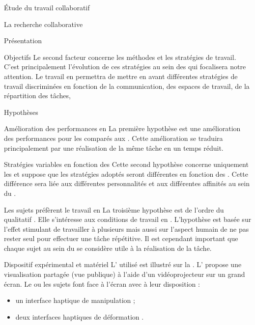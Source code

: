 \documentclass[myfrancais]{mythesis}
\begin{document}
\begin{mypart}{Étude du travail collaboratif}
\begin{mychapter}{La recherche collaborative}
\begin{mysection}{Présentation}
\begin{mysubsection}{Objectifs}
					Le second facteur concerne les méthodes et les stratégies de travail.
					C'est principalement l'évolution de ces stratégies au sein des  qui focalisera notre attention.
					Le travail en  permettra de mettre en avant différentes stratégies de travail discriminées en fonction de la communication, des espaces de travail, de la répartition des tâches, \myetc
				\end{mysubsection}
				\begin{mysubsection}{Hypothèses}
					\begin{myparagraph}{ Amélioration des performances en }
						La première hypothèse est une amélioration des performances pour les  comparés aux .
						Cette amélioration se traduira principalement par une réalisation de la même tâche en un temps réduit.
					\end{myparagraph}
					\begin{myparagraph}{ Stratégies variables en fonction des }
						Cette second hypothèse concerne uniquement les  et suppose que les stratégies adoptés seront différentes en fonction des .
						Cette différence sera liée aux différentes personnalités et aux différentes affinités au sein du .
					\end{myparagraph}
					\begin{myparagraph}{ Les sujets préfèrent le travail en }
						La troisième hypothèse est de l'ordre du qualitatif .
						Elle s'intéresse aux conditions de travail en .
						L'hypothèse est basée  sur l'effet stimulant de travailler à plusieurs mais aussi sur l'aspect humain de ne pas rester seul pour effectuer une tâche répétitive.
						Il est cependant important que chaque sujet au sein du  se considère utile à la réalisation de la tâche.
					\end{myparagraph}
				\end{mysubsection}
			\end{mysection}
			\begin{mysection}{Dispositif expérimental et matériel}
				L' utilisé est illustré sur la .
				L' propose une visualisation partagée (vue publique) à l'aide d'un vidéoprojecteur sur un grand écran.
				Le ou les sujets font face à l'écran avec à leur disposition :
				\begin{itemize}
					\item un interface haptique de manipulation ;
					\item deux interfaces haptiques de déformation .
				\end{itemize}


\end{mysection}
\end{mychapter}
\end{mypart}
\end{document}
